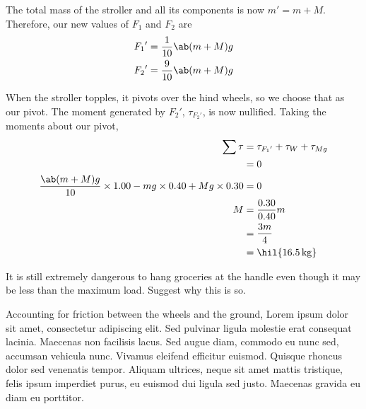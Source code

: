 The total mass of the stroller and all its components is now \(m' = m + M\).
Therefore, our new values of \(F_1\) and \(F_2\) are
\begin{align*}
  {F_1}' &= \f{1}{10}\ab(m+M)g\\
  {F_2}' &= \f{9}{10}\ab(m+M)g
\end{align*}

When the stroller topples, it pivots over the hind wheels, so we
choose that as our pivot.
The moment generated by \({F_2}'\), \(\tau_{{F_2}'}\), is now nullified.
Taking the moments about our pivot,
\begin{align*}
  \sum\tau &= \tau_{{F_1}'} + \tau_{W} + \tau_{Mg} \\
  &= 0\\
  \f{\ab(m+M)g}{10}\times 1.00 - mg \times 0.40 + Mg
  \times 0.30
  &= 0 \\
  M&=\f{0.30}{0.40}m\\
  &=\f{3m}{4} \\
  &= \hil{\qty{16.5}{\kg}}
\end{align*}

\begin{problem}
  It is still extremely dangerous to hang groceries at the handle
  even though it may be less than the
  maximum load. Suggest why this is so.
\end{problem}

Accounting for friction between the wheels and the ground,
Lorem ipsum dolor sit amet, consectetur adipiscing elit. Sed pulvinar
ligula molestie erat consequat lacinia. Maecenas non facilisis lacus.
Sed augue diam, commodo eu nunc sed, accumsan vehicula nunc. Vivamus
eleifend efficitur euismod. Quisque rhoncus dolor sed venenatis
tempor. Aliquam ultrices, neque sit amet mattis tristique, felis
ipsum imperdiet purus, eu euismod dui ligula sed justo. Maecenas
gravida eu diam eu porttitor.

